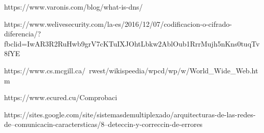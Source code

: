 \documentclass[spanish,12pt,letterpaper]{article}
\begin{document}
\begin{thebibliography}{9}
  https://www.varonis.com/blog/what-is-dns/

  https://www.welivesecurity.com/la-es/2016/12/07/codificacion-o-cifrado-diferencia/?fbclid=IwAR3R2RuHwb9grV7cKTuIXJOhtLbkw2AblOub1RrrMujh5nKns0tuqTv8fYE

  https://www.cs.mcgill.ca/~rwest/wikispeedia/wpcd/wp/w/World\_Wide\_Web.htm

  https://www.ecured.cu/Comprobaci%

  https://sites.google.com/site/sistemasdemultiplexado/arquitecturas-de-las-redes-de--comunicacin-caractersticas/8--deteccin-y-correccin-de-errores


\end{thebibliography}
\end{document}
